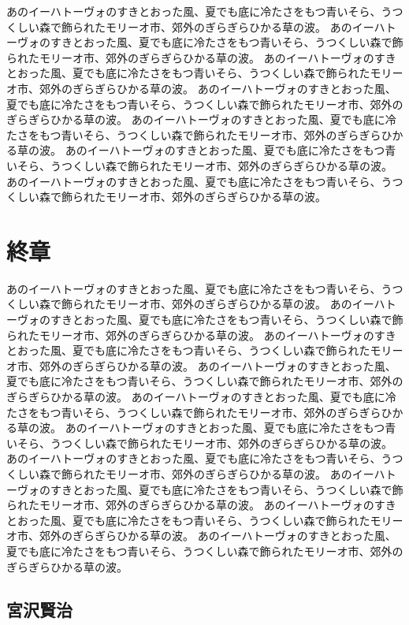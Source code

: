 \documentclass[b5j]{jsbook}
\begin{document}
あのイーハトーヴォのすきとおった風、夏でも底に冷たさをもつ青いそら、うつくしい森で飾られたモリーオ市、郊外のぎらぎらひかる草の波。
あのイーハトーヴォのすきとおった風、夏でも底に冷たさをもつ青いそら、うつくしい森で飾られたモリーオ市、郊外のぎらぎらひかる草の波。
あのイーハトーヴォのすきとおった風、夏でも底に冷たさをもつ青いそら、うつくしい森で飾られたモリーオ市、郊外のぎらぎらひかる草の波。
あのイーハトーヴォのすきとおった風、夏でも底に冷たさをもつ青いそら、うつくしい森で飾られたモリーオ市、郊外のぎらぎらひかる草の波。
あのイーハトーヴォのすきとおった風、夏でも底に冷たさをもつ青いそら、うつくしい森で飾られたモリーオ市、郊外のぎらぎらひかる草の波。
あのイーハトーヴォのすきとおった風、夏でも底に冷たさをもつ青いそら、うつくしい森で飾られたモリーオ市、郊外のぎらぎらひかる草の波。
あのイーハトーヴォのすきとおった風、夏でも底に冷たさをもつ青いそら、うつくしい森で飾られたモリーオ市、郊外のぎらぎらひかる草の波。

\chapter{終章}

あのイーハトーヴォのすきとおった風、夏でも底に冷たさをもつ青いそら、うつくしい森で飾られたモリーオ市、郊外のぎらぎらひかる草の波。
あのイーハトーヴォのすきとおった風、夏でも底に冷たさをもつ青いそら、うつくしい森で飾られたモリーオ市、郊外のぎらぎらひかる草の波。
あのイーハトーヴォのすきとおった風、夏でも底に冷たさをもつ青いそら、うつくしい森で飾られたモリーオ市、郊外のぎらぎらひかる草の波。
あのイーハトーヴォのすきとおった風、夏でも底に冷たさをもつ青いそら、うつくしい森で飾られたモリーオ市、郊外のぎらぎらひかる草の波。
あのイーハトーヴォのすきとおった風、夏でも底に冷たさをもつ青いそら、うつくしい森で飾られたモリーオ市、郊外のぎらぎらひかる草の波。
あのイーハトーヴォのすきとおった風、夏でも底に冷たさをもつ青いそら、うつくしい森で飾られたモリーオ市、郊外のぎらぎらひかる草の波。
あのイーハトーヴォのすきとおった風、夏でも底に冷たさをもつ青いそら、うつくしい森で飾られたモリーオ市、郊外のぎらぎらひかる草の波。
あのイーハトーヴォのすきとおった風、夏でも底に冷たさをもつ青いそら、うつくしい森で飾られたモリーオ市、郊外のぎらぎらひかる草の波。
あのイーハトーヴォのすきとおった風、夏でも底に冷たさをもつ青いそら、うつくしい森で飾られたモリーオ市、郊外のぎらぎらひかる草の波。
あのイーハトーヴォのすきとおった風、夏でも底に冷たさをもつ青いそら、うつくしい森で飾られたモリーオ市、郊外のぎらぎらひかる草の波。

\section{宮沢賢治}
\end{document}
